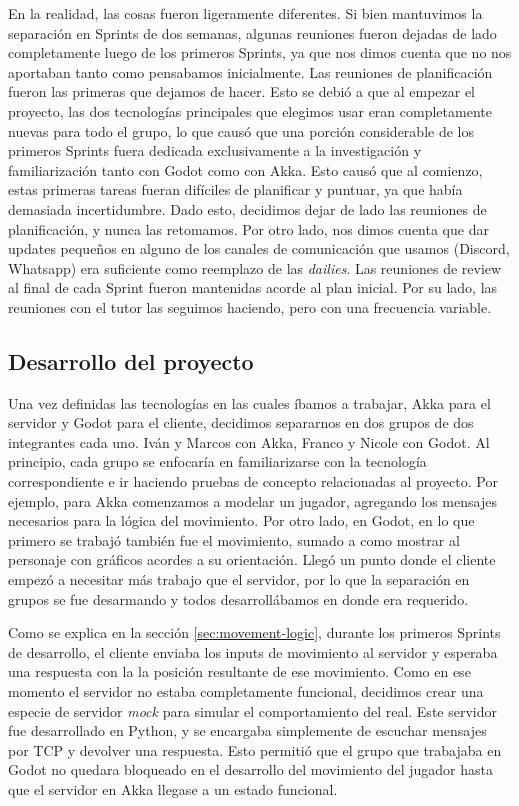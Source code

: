 En la realidad, las cosas fueron ligeramente diferentes. Si bien mantuvimos la separación en Sprints de dos semanas, algunas reuniones
fueron dejadas de lado completamente luego de los primeros Sprints, ya que nos dimos cuenta que no nos aportaban tanto como pensabamos
inicialmente.
Las reuniones de planificación fueron las primeras que dejamos de hacer. Esto se debió a que al empezar el proyecto, las 
dos tecnologías principales que elegimos usar eran completamente nuevas para todo el grupo, lo que causó que una porción considerable de
los primeros Sprints fuera dedicada exclusivamente a la investigación y familiarización tanto con Godot como con Akka. Esto causó que al
comienzo, estas primeras tareas fueran difíciles de planificar y puntuar, ya que había demasiada incertidumbre. Dado esto, decidimos dejar
de lado las reuniones de planificación, y nunca las retomamos.
Por otro lado, nos dimos cuenta que dar updates pequeños en alguno de los canales de comunicación que usamos (Discord, Whatsapp) era suficiente
como reemplazo de las \textit{dailies}.
Las reuniones de review al final de cada Sprint fueron mantenidas acorde al plan inicial.
Por su lado, las reuniones con el tutor las seguimos haciendo, pero con una frecuencia variable.

\subsection{Desarrollo del proyecto}

\noindent Una vez definidas las tecnologías en las cuales íbamos a trabajar, Akka para el servidor y Godot para el cliente, decidimos separarnos
en dos grupos de dos integrantes cada uno. Iván y Marcos con Akka, Franco y Nicole con Godot. Al principio, cada grupo se enfocaría en 
familiarizarse con la tecnología correspondiente e ir haciendo pruebas de concepto relacionadas al proyecto. Por ejemplo, para Akka 
comenzamos a modelar un jugador, agregando los mensajes necesarios para la lógica del movimiento. Por otro lado, en Godot, en lo que primero
se trabajó también fue el movimiento, sumado a como mostrar al personaje con gráficos acordes a su orientación.
Llegó un punto donde el cliente empezó a necesitar más trabajo que el servidor, por lo que la separación en grupos se fue desarmando y
todos desarrollábamos en donde era requerido.

Como se explica en la sección \ref{sec:movement-logic}, durante los primeros Sprints de desarrollo, el cliente enviaba los inputs de movimiento al servidor y esperaba una respuesta con la
la posición resultante de ese movimiento. Como en ese momento el servidor no estaba completamente funcional, decidimos crear una especie de servidor
\textit{mock} para simular el comportamiento del real. Este servidor fue desarrollado en Python, y se encargaba simplemente de escuchar mensajes por TCP
y devolver una respuesta. Esto permitió que el grupo que trabajaba en Godot no quedara bloqueado en el desarrollo del movimiento del jugador
hasta que el servidor en Akka llegase a un estado funcional.

